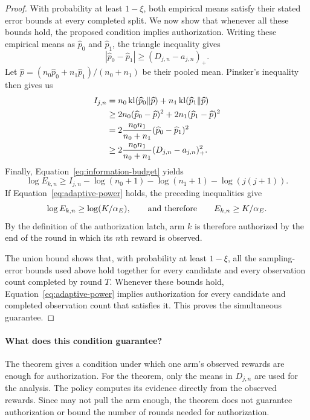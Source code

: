\begin{proof}
With probability at least $1-\xi$, both empirical means satisfy their
stated error bounds at every completed split.
We now show that whenever all these bounds hold, the proposed condition
implies authorization.
Writing these empirical means as $\widehat p_0$ and $\widehat p_1$,
the triangle inequality gives
\[
|\widehat p_0-\widehat p_1|
\geq(D_{j,n}-a_{j,n})_+.
\]
Let $\widehat p=(n_0\widehat p_0+n_1\widehat p_1)/(n_0+n_1)$
be their pooled mean.
Pinsker's inequality then gives us
\begin{align*}
I_{j,n}
&=n_0\operatorname{kl}(\widehat p_0\Vert\widehat p)
+n_1\operatorname{kl}(\widehat p_1\Vert\widehat p)
\\
&\geq2n_0(\widehat p_0-\widehat p)^2
+2n_1(\widehat p_1-\widehat p)^2
\\
&=2\frac{n_0n_1}{n_0+n_1}(\widehat p_0-\widehat p_1)^2
\\
&\geq2\frac{n_0n_1}{n_0+n_1}(D_{j,n}-a_{j,n})_+^2.
\end{align*}
Finally, Equation~\eqref{eq:information-budget} yields
\[
\log E_{k,n}
\geq I_{j,n}-\log(n_0+1)-\log(n_1+1)-\log(j(j+1)).
\]
If Equation~\eqref{eq:adaptive-power} holds, the preceding
inequalities give
\[
\log E_{k,n}\geq\log(K/\alpha_E),
\qquad\text{and therefore}\qquad
E_{k,n}\geq K/\alpha_E.
\]
By the definition of the authorization latch, arm $k$ is therefore
authorized by the end of the round in which its $n$th reward
is observed.

The union bound shows that, with probability at least $1-\xi$,
all the sampling-error bounds used above hold together for every
candidate and every observation count completed by round $T$.
Whenever these bounds hold, Equation~\eqref{eq:adaptive-power}
implies authorization for every candidate and completed observation
count that satisfies it.
This proves the simultaneous guarantee.
\end{proof}

\paragraph{What does this condition guarantee?}

The theorem gives a condition under which one arm's observed rewards
are enough for authorization.
For the theorem, only the means in $D_{j,n}$ are used for the analysis.
The policy computes its evidence directly from the observed rewards.
Since \method{} may not pull the arm enough, the theorem does not
guarantee authorization or bound the number of rounds needed for authorization.


